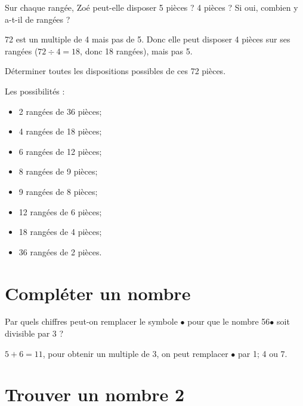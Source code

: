 \documentclass[a4paper,11pt]{exam}
\begin{document}
	\begin{questions}
		\question Sur chaque rangée, Zoé peut-elle disposer 5 pièces ? 4 pièces ? Si oui, combien y a-t-il de rangées ?
		\begin{solution}
			72 est un multiple de 4 mais pas de 5. Donc elle peut disposer 4 pièces sur ses rangées ($72 \div 4 = 18$, donc 18 rangées), mais pas 5.
		\end{solution}
		
		\question Déterminer toutes les dispositions possibles de ces 72 pièces.
		\begin{solution}
			Les possibilités :
			\begin{multicols}{2}
				\begin{itemize}
					\item 2 rangées de 36 pièces;
					\item 4 rangées de 18 pièces;
					\item 6 rangées de 12 pièces;
					\item 8 rangées de 9 pièces;
					\item 9 rangées de 8 pièces;
					\item 12 rangées de 6 pièces;
					\item 18 rangées de 4 pièces;
					\item 36 rangées de 2 pièces.
				\end{itemize}
			\end{multicols}
			
		\end{solution}
	\end{questions}
	
	\section{Compléter un nombre}
	
	\begin{questions}
		\question Par quels chiffres peut-on remplacer le symbole $\bullet$ pour que le nombre 56$\bullet$ soit divisible par 3 ?
		\begin{solution}
			$5+6 = 11$, pour obtenir un multiple de 3, on peut remplacer $\bullet$ par 1; 4 ou 7.
		\end{solution}
	\end{questions} 
	
\section{Trouver un nombre 2}
\end{document}
